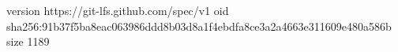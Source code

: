 version https://git-lfs.github.com/spec/v1
oid sha256:91b37f5ba8eac063986ddd8b03d8a1f4ebdfa8ce3a2a4663e311609e480a586b
size 1189
